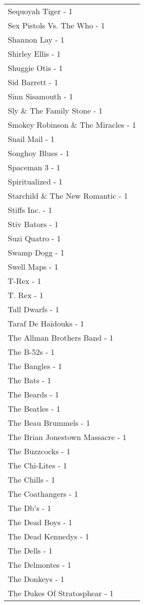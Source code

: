 \documentclass[
]{article}
\begin{document}
\begin{longtable}{l}
Sequoyah Tiger - 1 \\ 
Sex Pistols Vs. The Who - 1 \\ 
Shannon Lay - 1 \\ 
Shirley Ellis - 1 \\ 
Shuggie Otis - 1 \\ 
Sid Barrett - 1 \\ 
Sinn Sisamouth - 1 \\ 
Sly \& The Family Stone - 1 \\ 
Smokey Robinson \& The Miracles - 1 \\ 
Snail Mail - 1 \\ 
Songhoy Blues - 1 \\ 
Spaceman 3 - 1 \\ 
Spiritualized - 1 \\ 
Starchild \& The New Romantic - 1 \\ 
Stiffs Inc. - 1 \\ 
Stiv Bators - 1 \\ 
Suzi Quatro - 1 \\ 
Swamp Dogg - 1 \\ 
Swell Maps - 1 \\ 
T-Rex - 1 \\ 
T. Rex - 1 \\ 
Tall Dwarfs - 1 \\ 
Taraf De Haïdouks - 1 \\ 
The Allman Brothers Band - 1 \\ 
The B-52s - 1 \\ 
The Bangles - 1 \\ 
The Bats - 1 \\ 
The Beards - 1 \\ 
The Beatles - 1 \\ 
The Beau Brummels - 1 \\ 
The Brian Jonestown Massacre - 1 \\ 
The Buzzcocks - 1 \\ 
The Chi-Lites - 1 \\ 
The Chills - 1 \\ 
The Coathangers - 1 \\ 
The Db's - 1 \\ 
The Dead Boys - 1 \\ 
The Dead Kennedys - 1 \\ 
The Dells - 1 \\ 
The Delmontes - 1 \\ 
The Donkeys - 1 \\ 
The Dukes Of Stratosphear - 1 \\ 

\end{longtable}
\end{document}
